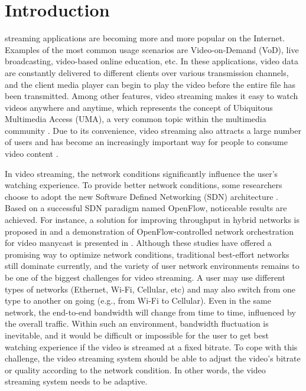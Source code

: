 \documentclass[journal]{IEEEtran}
\begin{document}
\section{Introduction}
\label{sec:intro}
% 
% 
% 
% 
 streaming applications are becoming more and more popular on the Internet. Examples of the most common usage scenarios are Video-on-Demand (VoD), live broadcasting, video-based online education, etc. In these applications, video data are constantly delivered to different clients over various transmission channels, and the client media player can begin to play the video before the entire file has been transmitted. Among other features, video streaming makes it easy to watch videos anywhere and anytime, which represents the concept of Ubiquitous Multimedia Access (UMA), a very common topic within the multimedia community \cite{Gualdi08}. Due to its convenience, video streaming also attracts a large number of users and has become an increasingly important way for people to consume video content \cite{Chen13}.

In video streaming, the network conditions significantly influence the user's watching experience. To provide better network conditions, some researchers choose to adopt the new Software Defined Networking (SDN) architecture \cite{Egilmez14}. Based on a successful SDN paradigm named OpenFlow, noticeable results are achieved. For instance, a solution for improving throughput in hybrid networks is proposed in \cite{Li14} and a demonstration of OpenFlow-controlled network orchestration for video manycast is presented in \cite{Xue15}. Although these studies have offered a promising way to optimize network conditions, traditional best-effort networks still dominate currently, and the variety of user network environments remains to be one of the biggest challenges for video streaming. A user may use different types of networks (Ethernet, Wi-Fi, Cellular, etc) and may also switch from one type to another on going (e.g., from Wi-Fi to Cellular). Even in the same network, the end-to-end bandwidth will change from time to time, influenced by the overall traffic. Within such an environment, bandwidth fluctuation is inevitable, and it would be difficult or impossible for the user to get best watching experience if the video is streamed at a fixed bitrate. To cope with this challenge, the video streaming system should be able to adjust the video's bitrate or quality according to the network condition. In other words, the video streaming system needs to be adaptive.
\end{document}
